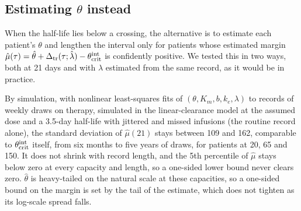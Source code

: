 \subsection{Estimating \texorpdfstring{$\theta$}{theta} instead}
\label{si:s6:theta}

When the half-life lies below a crossing, the alternative is to estimate each patient's $\theta$
and lengthen the interval only for patients whose estimated margin
$\hat\mu(\tau)=\hat\theta+\Delta_{\mathrm{tr}}(\tau;\hat\lambda)-\theta_{\mathrm{crit}}^{\mathrm{int}}$ is confidently positive. We tested this in
two ways, both at 21 days and with $\lambda$ estimated from the same record, as it would be in
practice.

By simulation, with nonlinear least-squares fits of $(\theta,K_m,b,k_e,\lambda)$ to records of
weekly draws on therapy, simulated in the linear-clearance model at the assumed dose and a
3.5-day half-life with jittered and missed infusions (the routine record alone), the standard
deviation of $\hat\mu(21)$ stays between 109 and 162\um, comparable to $\theta_{\mathrm{crit}}^{\mathrm{int}}$ itself, from six
months to five years of draws, for patients at 20, 65 and 150\um. It does not shrink with record
length, and the 5th percentile of $\hat\mu$ stays below zero at every capacity and length, so a
one-sided lower bound never clears zero. $\hat\theta$ is heavy-tailed on the natural scale at
these capacities, so a one-sided bound on the margin is set by the tail of the estimate, which
does not tighten as its log-scale spread falls.

